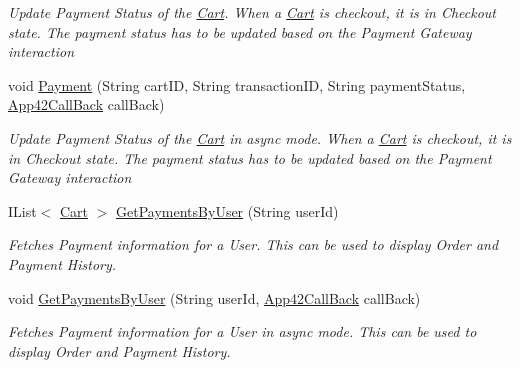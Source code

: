 \begin{DoxyCompactItemize}
\begin{DoxyCompactList}\small\item\em Update Payment Status of the \hyperlink{classcom_1_1shephertz_1_1app42_1_1paas_1_1sdk_1_1csharp_1_1shopping_1_1_cart}{Cart}. When a \hyperlink{classcom_1_1shephertz_1_1app42_1_1paas_1_1sdk_1_1csharp_1_1shopping_1_1_cart}{Cart} is checkout, it is in Checkout state. The payment status has to be updated based on the Payment Gateway interaction \end{DoxyCompactList}\item 
void \hyperlink{classcom_1_1shephertz_1_1app42_1_1paas_1_1sdk_1_1csharp_1_1shopping_1_1_cart_service_a2aa917c44a2ce2a01d212de3052b1bd6}{Payment} (String cart\+I\+D, String transaction\+I\+D, String payment\+Status, \hyperlink{interfacecom_1_1shephertz_1_1app42_1_1paas_1_1sdk_1_1csharp_1_1_app42_call_back}{App42\+Call\+Back} call\+Back)
\begin{DoxyCompactList}\small\item\em Update Payment Status of the \hyperlink{classcom_1_1shephertz_1_1app42_1_1paas_1_1sdk_1_1csharp_1_1shopping_1_1_cart}{Cart} in async mode. When a \hyperlink{classcom_1_1shephertz_1_1app42_1_1paas_1_1sdk_1_1csharp_1_1shopping_1_1_cart}{Cart} is checkout, it is in Checkout state. The payment status has to be updated based on the Payment Gateway interaction \end{DoxyCompactList}\item 
I\+List$<$ \hyperlink{classcom_1_1shephertz_1_1app42_1_1paas_1_1sdk_1_1csharp_1_1shopping_1_1_cart}{Cart} $>$ \hyperlink{classcom_1_1shephertz_1_1app42_1_1paas_1_1sdk_1_1csharp_1_1shopping_1_1_cart_service_a200b6c6a3942efc96fca19e13ed42bf8}{Get\+Payments\+By\+User} (String user\+Id)
\begin{DoxyCompactList}\small\item\em Fetches Payment information for a User. This can be used to display Order and Payment History. \end{DoxyCompactList}\item 
void \hyperlink{classcom_1_1shephertz_1_1app42_1_1paas_1_1sdk_1_1csharp_1_1shopping_1_1_cart_service_a1fe9453750e6e016941311438f771990}{Get\+Payments\+By\+User} (String user\+Id, \hyperlink{interfacecom_1_1shephertz_1_1app42_1_1paas_1_1sdk_1_1csharp_1_1_app42_call_back}{App42\+Call\+Back} call\+Back)
\begin{DoxyCompactList}\small\item\em Fetches Payment information for a User in async mode. This can be used to display Order and Payment History. \end{DoxyCompactList}\item 

\end{DoxyCompactItemize}
